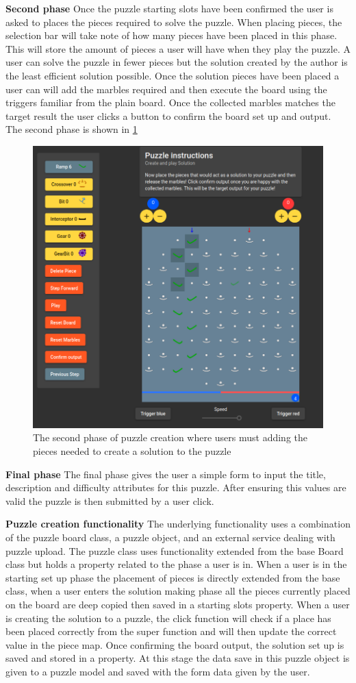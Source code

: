 \documentclass{l4proj}
\begin{document}
\textbf{Second phase}
Once the puzzle starting slots have been confirmed the user is asked to places the pieces required to solve the puzzle. When placing pieces, the selection bar will take note of how many pieces have been placed in this phase. This will store the amount of pieces a user will have when they play the puzzle. A user can solve the puzzle in fewer pieces but the solution created by the author is the least efficient solution possible. Once the solution pieces have been placed a user can will add the marbles required and then execute the board using the triggers familiar from the plain board. Once the collected marbles matches the target result the user clicks a button to confirm the board set up and output. The second phase is shown in \ref{fig:puzzleCreation}


\begin{figure}
    \centering
    \includegraphics[width=0.7\linewidth]{images/puzzleCreation.png}
    \caption{The second phase of puzzle creation where users must adding the pieces needed to create a solution to the puzzle}
    \label{fig:puzzleCreation}
\end{figure}

\textbf{Final phase}
The final phase gives the user a simple form to input the title, description and difficulty attributes for this puzzle. After ensuring this values are valid the puzzle is then submitted by a user click.

\textbf{Puzzle creation functionality}
The underlying functionality uses a combination of the puzzle board class, a puzzle object, and an external service dealing with puzzle upload. The puzzle class uses functionality extended from the base Board class but holds a property related to the phase a user is in. When a user is in the starting set up phase the placement of pieces is directly extended from the base class, when a user enters the solution making phase all the pieces currently placed on the board are deep copied then saved in a starting slots property. When a user is creating the solution to a puzzle, the click function will check if a place has been placed correctly from the super function and will then update the correct value in the piece map. Once confirming the board output, the solution set up is saved and stored in a property. At this stage the data save in this puzzle object is given to a puzzle model and saved with the form data given by the user.
\end{document}
